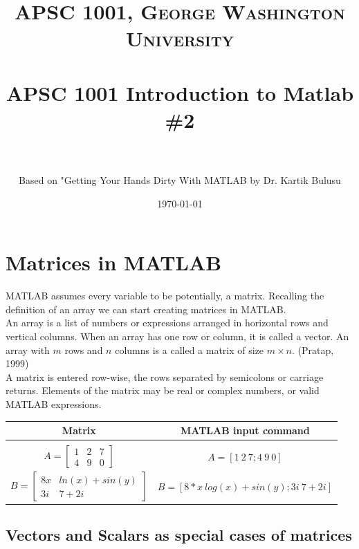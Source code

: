 \documentclass[paper=a4, fontsize=11pt]{scrartcl} %
\title{	
\normalfont \normalsize 
\textsc{APSC 1001, George Washington University} \\ [25pt] %
\horrule{0.5pt} \\[0.4cm] %
\huge APSC 1001 Introduction to Matlab \#2 \\ %
\horrule{2pt} \\[0.5cm] %
}
\author{\normalsize Based on "Getting Your Hands Dirty With MATLAB by Dr. Kartik Bulusu } %
\date{\normalsize \today } %
\numberwithin{equation}{section} %
\numberwithin{figure}{section} %
\numberwithin{table}{section} %
\begin{document}
\maketitle %

\section{Matrices in MATLAB}

MATLAB assumes every variable to be potentially, a matrix. Recalling the deﬁnition of an array we can start creating matrices in MATLAB.\\

An array is a list of numbers or expressions arranged in horizontal rows and vertical columns. When an array has one row or column, it is called a vector. An array with $m$ rows and $n$ columns is a called a matrix of size $m \times n$. (Pratap, 1999)\\

A matrix is entered row-wise, the rows separated by semicolons or carriage returns. Elements of the matrix may be real or complex numbers, or valid MATLAB expressions.

\begin{center}
	\begin{tabular}{ c c }
	\toprule
	\textbf{Matrix} & \textbf{MATLAB input command}\\
	\midrule\\
	\addlinespace[-2ex]
	$A = \begin{bmatrix}  1 & 2 & 7 \\ 4 & 9 & 0 \end{bmatrix}$ &
	$A = [1\ 2\ 7; 4\ 9\ 0]$\\
	\addlinespace[1.5ex]
	$B = \begin{bmatrix}  8x & ln(x)+sin(y)\\ 3i & 7+2i \end{bmatrix}$ &
	$B = [8*x\ log(x)+sin(y); 3i\ 7+2i]$\\
	\bottomrule
	\end{tabular}
\end{center}

\subsection{Vectors and Scalars as special cases of matrices}
	
\end{document}
